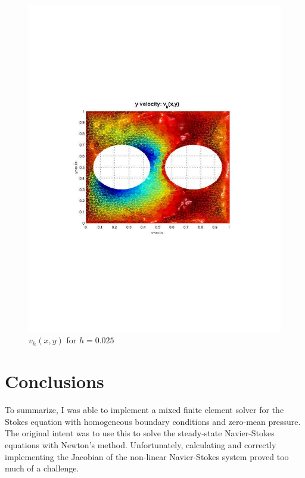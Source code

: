 \documentclass[12pt]{article}
\begin{document}
                \begin{figure}[htb]
                    \begin{center}
                \includegraphics[scale=0.50]{./../files/crazy/v.pdf}
                \caption{$v_h(x,y)$ for $h = 0.025$}
            \end{center}
            \end{figure}

                \section{Conclusions}

                To summarize, I was able to implement a mixed finite element solver
                for the Stokes equation with homogeneous boundary conditions and zero-mean pressure.
                The original intent was to use this to solve the steady-state Navier-Stokes equations
                with Newton's method. Unfortunately, calculating and correctly implementing the Jacobian of the non-linear Navier-Stokes
                system proved too much of a challenge.
\end{document}

